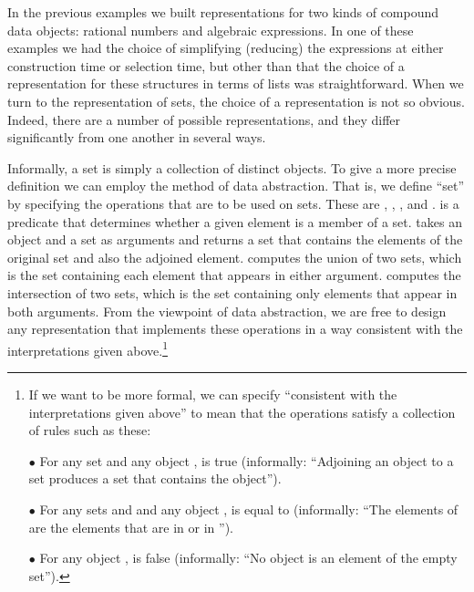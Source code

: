In the previous examples we built representations for two kinds of compound
data objects: rational numbers and algebraic expressions.  In one of these
examples we had the choice of simplifying (reducing) the expressions at either
construction time or selection time, but other than that the choice of a
representation for these structures in terms of lists was straightforward. When
we turn to the representation of sets, the choice of a representation is not so
obvious.  Indeed, there are a number of possible representations, and they
differ significantly from one another in several ways.

Informally, a set is simply a collection of distinct objects.  To give a more
precise definition we can employ the method of data abstraction.  That is, we
define ``set'' by specifying the operations that are to be used on sets.  These
are , , , and
.   is a predicate that determines
whether a given element is a member of a set.   takes an
object and a set as arguments and returns a set that contains the elements of
the original set and also the adjoined element.   computes the
union of two sets, which is the set containing each element that appears in
either argument.   computes the intersection of two
sets, which is the set containing only elements that appear in both arguments.
From the viewpoint of data abstraction, we are free to design any
representation that implements these operations in a way consistent with the
interpretations given above.\footnote{If we want to be more formal, we can
specify ``consistent with the interpretations given above'' to mean that the
operations satisfy a collection of rules such as these:

\noindent
\( \bullet \) For any set  and any object ,
is true (informally: ``Adjoining an object to a
set produces a set that contains the object'').

\noindent
\( \bullet \) For any sets  and  and any object ,
is equal to
(informally: ``The elements of  are the elements that
are in  or in '').

\noindent
\( \bullet \) For any object ,
is false (informally: ``No object is an element of the empty set'').
}

